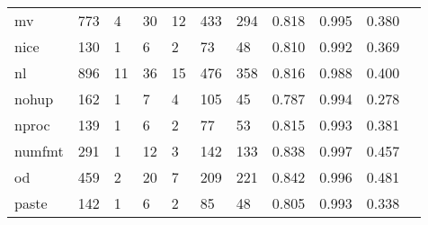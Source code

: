 \begin{longtable}{lp{1.10cm}p{1.10cm}p{1.10cm}p{1.10cm}p{1.10cm}p{1.10cm}p{1.10cm}p{1.10cm}p{1.10cm}p{1.10cm}}
mv        &                    773 &                                  4 &                                30 &                               12 &                               433 &                             294 &                             0.818 &                                 0.995 &                               0.380 \\
nice      &                    130 &                                  1 &                                 6 &                                2 &                                73 &                              48 &                             0.810 &                                 0.992 &                               0.369 \\
nl        &                    896 &                                 11 &                                36 &                               15 &                               476 &                             358 &                             0.816 &                                 0.988 &                               0.400 \\
nohup     &                    162 &                                  1 &                                 7 &                                4 &                               105 &                              45 &                             0.787 &                                 0.994 &                               0.278 \\
nproc     &                    139 &                                  1 &                                 6 &                                2 &                                77 &                              53 &                             0.815 &                                 0.993 &                               0.381 \\
numfmt    &                    291 &                                  1 &                                12 &                                3 &                               142 &                             133 &                             0.838 &                                 0.997 &                               0.457 \\
od        &                    459 &                                  2 &                                20 &                                7 &                               209 &                             221 &                             0.842 &                                 0.996 &                               0.481 \\
paste     &                    142 &                                  1 &                                 6 &                                2 &                                85 &                              48 &                             0.805 &                                 0.993 &                               0.338 \\

\end{longtable}
